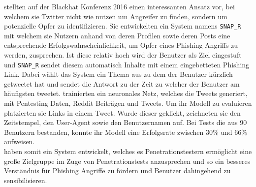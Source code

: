 \documentclass[
    12pt, %
    DIV10,
    ngerman, %
    a4paper, %
    oneside, %
    titlepage, %
    parskip=half, %
    headings=normal, %
    listof=totoc, %
    bibliography=totoc, %
    index=totoc, %
    captions=tableheading, %
    final %
]{scrreprt}
\begin{document}
\textcite{Seymour} stellten auf der Blackhat Konferenz 2016 einen interessanten Ansatz vor, bei welchem sie Twitter nicht wie \textcite{Javed2019} nutzen um Angreifer zu finden, sondern um potenzielle Opfer zu identifizieren. Sie entwickelten ein System namens \texttt{SNAP\_R} mit welchem sie Nutzern anhand von deren Profilen sowie deren Posts eine entsprechende Erfolgswahrscheinlichkeit, um Opfer eines Phishing Angriffs zu werden, zusprechen. Ist diese relativ hoch wird der Benutzer als Ziel eingestuft und \texttt{SNAP\_R} sendet diesem automatisch Inhalte mit einem eingebetteten Phishing Link. Dabei wählt das System ein Thema aus zu dem der Benutzer kürzlich getweetet hat und sendet die Antwort zu der Zeit zu welcher der Benutzer am häufigsten tweetet. \citeauthor{Seymour} trainierten ein neuronales Netz, welches die Tweets generiert, mit Pentesting Daten, Reddit Beiträgen und Tweets. Um ihr Modell zu evaluieren platzierten sie Links in einem Tweet. Wurde dieser geklickt, zeichneten sie den Zeitstempel, den User-Agent sowie den Benutzernamen auf. Bei Tests die aus 90 Benutzern bestanden, konnte ihr Modell eine Erfolgsrate zwischen 30\% und 66\% aufweisen.\\
\citeauthor{Seymour} haben somit ein System entwickelt, welches es Penetrationstestern ermöglicht eine große Zielgruppe im Zuge von Penetrationstests anzusprechen und so ein besseres Verständnis für Phishing Angriffe zu fördern und Benutzer dahingehend zu sensibilisieren.
\end{document}
